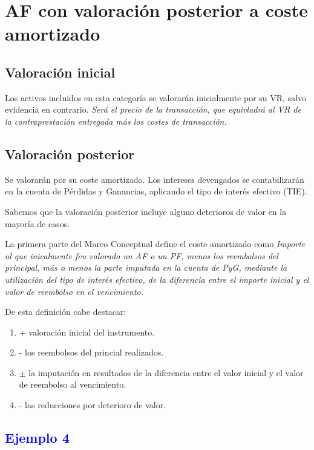\section{AF con valoración posterior a coste amortizado}

\subsection{Valoración inicial}

Los activos incluidos en esta categoría se valorarán inicialmente por su VR, salvo evidencia en contrario. \textit{Será el precio de la transacción, que equivladrá al VR de la contraprestación entregada más los costes de transacción.}

\subsection{Valoración posterior}

Se valorarán por su coste amortizado. Los intereses devengados se contabilizarán en la cuenta de Pérdidas y Ganancias, aplicando el tipo de interés efectivo (TIE).

Sabemos que la valoración posterior incluye alguno deterioros de valor en la mayoría de casos.

La primera parte del Marco Conceptual define el coste amortizado como \textit{Importe al que inicalmente feu valorado un AF o un PF, menos los reembolsos del principal, más o menos la parte imputada en la cuenta de PyG, mediante la utilización del tipo de interés efectivo, de la diferencia entre el importe inicial y el valor de reembolso en el vencimiento.}

De esta definición cabe destacar:
\begin{enumerate}
    \item + valoración inicial del instrumento.
    \item - los reembolsos del princial realizados.
    \item $\pm$ la imputación en resultados de la diferencia entre el valor inicial y el valor de reembolso al vencimiento.
    \item - las reducciones por deterioro de valor.
\end{enumerate}

\subsection*{\textcolor{blue}{Ejemplo 4}}

